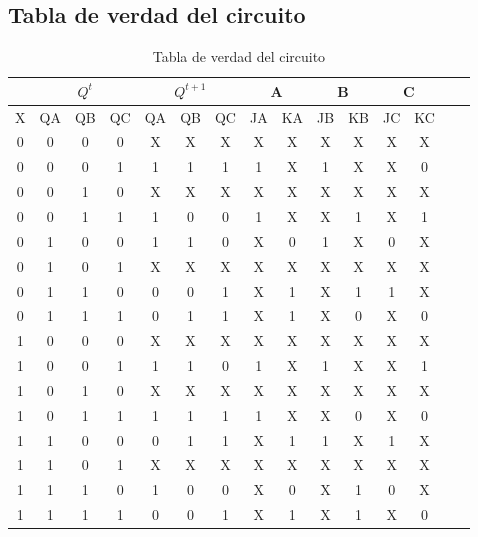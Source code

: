 \documentclass[12pt, oneside, openany]{article}
\begin{document}
\subsection{Tabla de verdad del circuito}
{\sffamily\large
    \begin{table}[h!]
        \centering
        \sffamily
        \begin{tabular}{|c||c|c|c||c|c|c||c|c||c|c||c|c||c|c|}
            \hline
            & \multicolumn{3}{c||}{$Q^t$} & \multicolumn{3}{c||}{$Q^{t+1}$} & \multicolumn{2}{c||}{A} & \multicolumn{2}{c||}{B} & \multicolumn{2}{c||}{C} \\
            \hline
            X & QA & QB & QC & QA & QB & QC & JA & KA & JB & KB & JC & KC \\
            \hline\hline
            0 & 0 & 0 & 0 & X & X & X & X & X & X & X & X & X \\
            \hline
            0 & 0 & 0 & 1 & 1 & 1 & 1 & 1 & X & 1 & X & X & 0 \\
            \hline
            0 & 0 & 1 & 0 & X & X & X & X & X & X & X & X & X \\
            \hline
            0 & 0 & 1 & 1 & 1 & 0 & 0 & 1 & X & X & 1 & X & 1 \\
            \hline
            0 & 1 & 0 & 0 & 1 & 1 & 0 & X & 0 & 1 & X & 0 & X \\
            \hline
            0 & 1 & 0 & 1 & X & X & X & X & X & X & X & X & X \\
            \hline
            0 & 1 & 1 & 0 & 0 & 0 & 1 & X & 1 & X & 1 & 1 & X \\
            \hline
            0 & 1 & 1 & 1 & 0 & 1 & 1 & X & 1 & X & 0 & X & 0 \\
            \hline\hline
            1 & 0 & 0 & 0 & X & X & X & X & X & X & X & X & X \\
            \hline
            1 & 0 & 0 & 1 & 1 & 1 & 0 & 1 & X & 1 & X & X & 1 \\
            \hline
            1 & 0 & 1 & 0 & X & X & X & X & X & X & X & X & X \\
            \hline
            1 & 0 & 1 & 1 & 1 & 1 & 1 & 1 & X & X & 0 & X & 0 \\
            \hline
            1 & 1 & 0 & 0 & 0 & 1 & 1 & X & 1 & 1 & X & 1 & X \\
            \hline
            1 & 1 & 0 & 1 & X & X & X & X & X & X & X & X & X \\
            \hline
            1 & 1 & 1 & 0 & 1 & 0 & 0 & X & 0 & X & 1 & 0 & X \\
            \hline
            1 & 1 & 1 & 1 & 0 & 0 & 1 & X & 1 & X & 1 & X & 0 \\
            \hline
        \end{tabular}
        \caption{\sffamily Tabla de verdad del circuito}
        \label{tab:tablaCircuito}
    \end{table}
    
}
\end{document}
